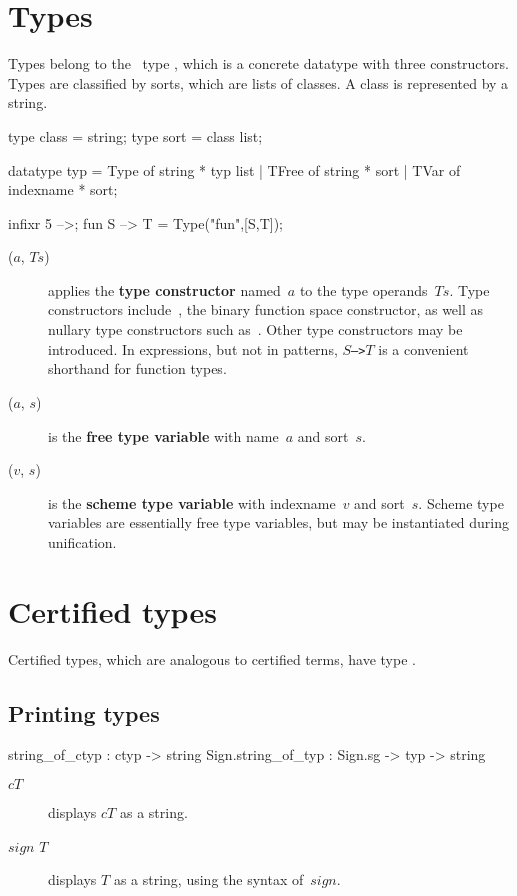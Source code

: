 \section{Types}
Types belong to the \ML\ type , which is a concrete
datatype with three constructors.  Types are classified by sorts, which are
lists of classes.  A class is represented by a string.
\begin{ttbox}
type class = string;
type sort  = class list;

datatype typ = Type  of string * typ list
             | TFree of string * sort
             | TVar  of indexname * sort;

infixr 5 -->;
fun S --> T = Type("fun",[S,T]);
\end{ttbox}
\begin{description}
\item[($a$, $Ts$)] 
applies the {\bf type constructor} named~$a$ to the type operands~$Ts$.
Type constructors include~, the binary function space
constructor, as well as nullary type constructors such
as~.  Other type constructors may be introduced.  In
expressions, but not in patterns, \hbox{\tt$S$-->$T$} is a convenient
shorthand for function types.

\item[($a$, $s$)] 
is the {\bf free type variable} with name~$a$ and sort~$s$.

\item[($v$, $s$)] 
is the {\bf scheme type variable} with indexname~$v$ and sort~$s$.  Scheme
type variables are essentially free type variables, but may be instantiated
during unification.
\end{description}


\section{Certified types}
Certified types, which are analogous to certified terms, have type 
.

\subsection{Printing types}
\begin{ttbox} 
     string_of_ctyp :           ctyp -> string
Sign.string_of_typ  : Sign.sg -> typ -> string
\end{ttbox}
\begin{description}
\item[ $cT$] 
displays $cT$ as a string.

\item[ $sign$ $T$] 
displays $T$ as a string, using the syntax of~$sign$.
\end{description}


